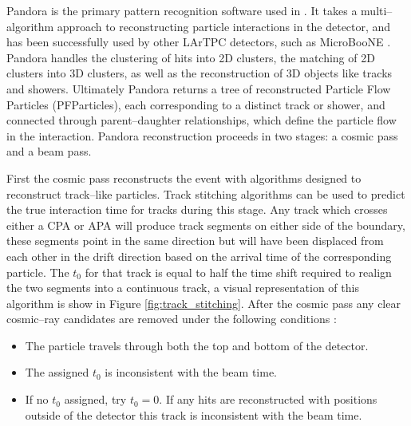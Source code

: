 Pandora \cite{Marshall2015} is the primary pattern recognition software used in
\protodune{}. It takes a multi--algorithm approach to reconstructing particle
interactions in the detector, and has been successfully used by other LArTPC
detectors, such as MicroBooNE \cite{Acciarri:2017hat}. Pandora handles the 
clustering of hits into 2D clusters, the matching of 2D clusters into 3D
clusters, as well as the reconstruction of 3D objects like tracks and 
showers. Ultimately Pandora returns a tree of reconstructed Particle Flow
Particles (PFParticles), each corresponding to a distinct track or shower, and 
connected through parent--daughter relationships, which define the particle flow
in the interaction. Pandora reconstruction proceeds in two stages: a cosmic 
pass and a beam pass. 


First the cosmic pass reconstructs the event with algorithms designed to 
reconstruct track--like particles. Track stitching algorithms can be used to
predict the true interaction time for tracks during this stage. Any track which 
crosses either a CPA or APA will produce track segments on either side of the 
boundary, these segments point in the same direction but will have been 
displaced from each other in the drift direction based on the arrival time of 
the corresponding particle. The $t_0$ for that track is equal to half the time 
shift required to realign the two segments into a continuous track, a visual
representation of this algorithm is show in Figure \ref{fig:track_stitching}. 
After the cosmic pass any clear cosmic--ray candidates are removed under the 
following conditions \cite{protoduneperf}:
\begin{itemize}
	\item The particle travels through both the top and bottom of the detector.
	\item The assigned $t_0$ is inconsistent with the beam time.
	\item If no $t_0$ assigned, try $t_0 = 0$. If any hits are reconstructed 
		with positions outside of the detector this track is inconsistent with the 
		beam time.
\end{itemize}

